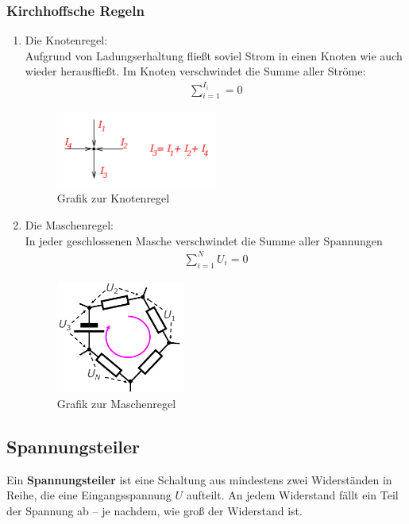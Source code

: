 \documentclass{article}
\begin{document}
\subsubsection{Kirchhoffsche Regeln}
\begin{enumerate}
    \item Die Knotenregel:\\
        Aufgrund von Ladungserhaltung fließt soviel Strom in einen Knoten wie auch wieder herausfließt.
        Im Knoten verschwindet die Summe aller Ströme:
        \begin{align}
            \sum_{i=1}^{I_i}=0
        \end{align}
        \begin{figure}[H]
            \centering
            \includegraphics[width=0.5\textwidth]{knotenregel.png}
            \caption{Grafik zur Knotenregel}
        \end{figure}
    \item Die Maschenregel:\\
        In jeder geschlossenen Masche verschwindet die Summe aller Spannungen
        \begin{align}
            \sum_{i=1}^{N}U_i=0
        \end{align}
        \begin{figure}[H]
            \centering
            \includegraphics[width=0.4\textwidth]{Maschenregel.png}
            \caption{Grafik zur Maschenregel}
        \end{figure}
\end{enumerate}

\subsection{Spannungsteiler}
Ein \textbf{Spannungsteiler} ist eine Schaltung aus mindestens zwei Widerständen in Reihe, die eine Eingangsspannung $U$ aufteilt. An jedem Widerstand fällt ein Teil der Spannung ab – je nachdem, wie groß der Widerstand ist.
\end{document}

